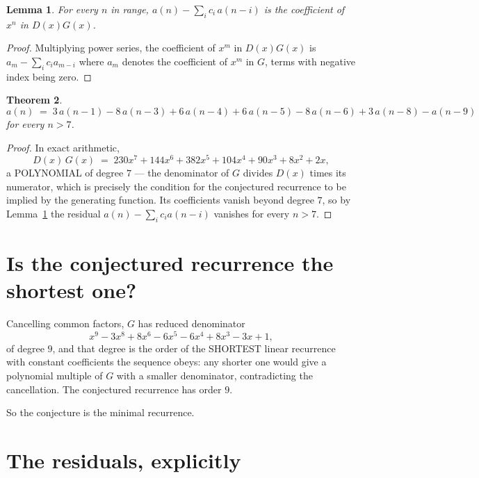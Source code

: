 \documentclass[11pt,a4paper]{article}
\theoremstyle{plain}
\newtheorem{theorem}{Theorem}
\newtheorem{lemma}[theorem]{Lemma}
\theoremstyle{definition}
\begin{document}
\begin{lemma}\label{lem:key}
For every $n$ in range, $a(n)-\sum_i c_i\,a(n-i)$ is the coefficient of $x^{n}$ in
$D(x)G(x)$.
\end{lemma}

\begin{proof}
Multiplying power series, the coefficient of $x^{m}$ in $D(x)G(x)$ is
$a_m-\sum_i c_i a_{m-i}$ where $a_m$ denotes the coefficient of $x^{m}$ in $G$, terms with
negative index being zero.
\end{proof}

\begin{theorem}
\[
a(n)\;=\;3\,a(n-1) - 8\,a(n-3) + 6\,a(n-4) + 6\,a(n-5) - 8\,a(n-6) + 3\,a(n-8) - a(n-9)
\]
for every $n>7$.
\end{theorem}

\begin{proof}
In exact arithmetic,
\[
D(x)\,G(x)\;=\;230 x^{7} + 144 x^{6} + 382 x^{5} + 104 x^{4} + 90 x^{3} + 8 x^{2} + 2 x,
\]
a POLYNOMIAL of degree $7$ --- the denominator of $G$ divides $D(x)$ times its numerator,
which is precisely the condition for the conjectured recurrence to be implied by the
generating function. Its coefficients vanish beyond degree $7$, so by
Lemma~\ref{lem:key} the residual $a(n)-\sum_ic_ia(n-i)$ vanishes for every
$n>7$.
\end{proof}

\section{Is the conjectured recurrence the shortest one?}

Cancelling common factors, $G$ has reduced denominator
\[
x^{9} - 3 x^{8} + 8 x^{6} - 6 x^{5} - 6 x^{4} + 8 x^{3} - 3 x + 1,
\]
of degree $9$, and that degree is the order of the SHORTEST linear recurrence with
constant coefficients the sequence obeys: any shorter one would give a polynomial multiple of
$G$ with a smaller denominator, contradicting the cancellation. The conjectured recurrence has
order $9$.

So the conjecture is the minimal recurrence.

\section{The residuals, explicitly}
\end{document}
